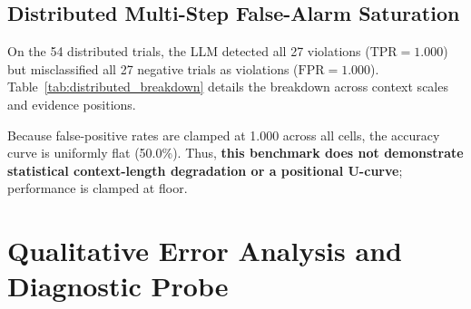 \documentclass[conference]{IEEEtran}
\begin{document}
\subsection{Distributed Multi-Step False-Alarm Saturation}
On the 54 distributed trials, the LLM detected all 27 violations ($\text{TPR}=1.000$) but misclassified all 27 negative trials as violations ($\text{FPR}=1.000$). Table~\ref{tab:distributed_breakdown} details the breakdown across context scales and evidence positions.

\begin{table}[h]
\caption{Distributed Condition Breakdown for LLM Monitor ($n=54$)}
\label{tab:distributed_breakdown}
\centering
\scriptsize
{}
\end{table}

Because false-positive rates are clamped at 1.000 across all cells, the accuracy curve is uniformly flat (50.0\%). Thus, \textbf{this benchmark does not demonstrate statistical context-length degradation or a positional U-curve}; performance is clamped at floor.

\section{Qualitative Error Analysis and Diagnostic Probe}
\end{document}
